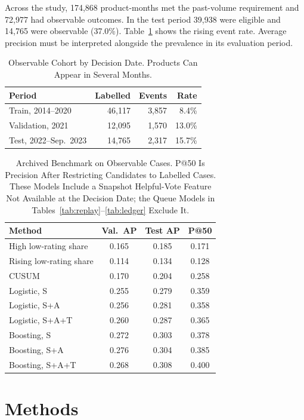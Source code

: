 \documentclass[conference]{IEEEtran}
\begin{document}
Across the study, 174,868 product-months met the past-volume requirement and 72,977 had observable outcomes. In the test period 39,938 were eligible and 14,765 were observable (37.0\%). Table~\ref{tab:cohort} shows the rising event rate. Average precision must be interpreted alongside the prevalence in its evaluation period.

\begin{table}[t]
\caption{Observable Cohort by Decision Date. Products Can Appear in Several Months.}
\label{tab:cohort}
\centering\footnotesize
\begin{tabular}{@{}lrrr@{}}
\toprule
Period & Labelled & Events & Rate \\
\midrule
Train, 2014--2020 & 46,117 & 3,857 & 8.4\% \\
Validation, 2021 & 12,095 & 1,570 & 13.0\% \\
Test, 2022--Sep.\ 2023 & 14,765 & 2,317 & 15.7\% \\
\bottomrule
\end{tabular}
\end{table}

\begin{table}[t]
\caption{Archived Benchmark on Observable Cases. P@50 Is Precision After Restricting Candidates to Labelled Cases. These Models Include a Snapshot Helpful-Vote Feature Not Available at the Decision Date; the Queue Models in Tables~\ref{tab:replay}--\ref{tab:ledger} Exclude It.}
\label{tab:bench}
\centering\footnotesize
\begin{tabular}{@{}lccc@{}}
\toprule
Method & Val.\ AP & Test AP & P@50 \\
\midrule
High low-rating share & 0.165 & 0.185 & 0.171 \\
Rising low-rating share & 0.114 & 0.134 & 0.128 \\
CUSUM & 0.170 & 0.204 & 0.258 \\
Logistic, S & 0.255 & 0.279 & 0.359 \\
Logistic, S+A & 0.256 & 0.281 & 0.358 \\
Logistic, S+A+T & 0.260 & 0.287 & 0.365 \\
Boosting, S & 0.272 & 0.303 & 0.378 \\
Boosting, S+A & 0.276 & 0.304 & 0.385 \\
Boosting, S+A+T & 0.268 & 0.308 & 0.400 \\
\bottomrule
\end{tabular}
\end{table}

\section{Methods}
\end{document}
